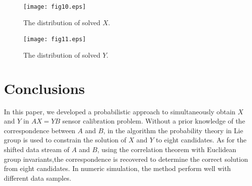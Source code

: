 \documentclass[letterpaper, 10 pt, conference]{ieeeconf}  %
\begin{document}
\begin{center}
\begin{figure}
\centering
\texttt{[image: fig10.eps]}
\caption{
The distribution of solved $X$.
}
\label{fig10}
\end{figure}
\end{center}

\begin{center}
\begin{figure}
\centering
\texttt{[image: fig11.eps]}
\caption{
The distribution of solved $Y$.
}
\label{fig11}
\end{figure}
\end{center}

\section{Conclusions}
\label{sect5}

In this paper, we developed a probabilistic approach to simultaneously obtain  $X$ and $Y$ in $AX=YB$ sensor calibration problem. Without a prior knowledge of the correspondence between $A$ and $B$, in the algorithm the probability theory in Lie group is used to constrain the solution of $X$ and $Y$ to eight candidates. As for the shifted data stream of $A$ and $B$, using the correlation theorem with Euclidean group invariants,the correspondence is recovered to determine the correct solution from eight candidates. In numeric simulation, the method perform well with different data samples.

\addtolength{\textheight}{-12cm}   %




\end{document}
